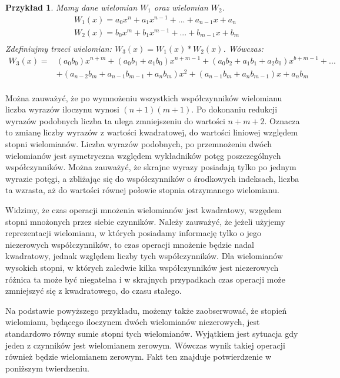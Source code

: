 \documentclass[twoside,a4paper]{book}
\newtheorem{example}{Przykład}
\begin{document}
\begin{example}
	Mamy dane wielomian $W_1$ oraz wielomian $W_2$.
	\begin{equation}
	\begin{split}
	&W_1(x) = a_0x^n + a_1x^{n-1} + ... + a_{n-1}x + a_n \\
	&W_2(x) = b_0x^m + b_1x^{m-1} + ... + b_{m-1}x + b_m \\
	\end{split}
	\end{equation}
	Zdefiniujmy trzeci wielomian: $W_3(x) = W_1(x) * W_2(x)$. Wówczas:
	\begin{equation}
		\begin{split}
		W_3(x) = &(a_0b_0)x^{n+m} + (a_0b_1+a_1b_0)x^{n+m-1} + (a_0b_2+a_1b_1+a_2b_0)x^{b+m-1} + ... \\
		&+ (a_{n-2}b_m+a_{n-1}b_{m-1}+a_nb_m)x^2 + (a_{n-1}b_m + a_nb_{m-1})x + a_nb_m \\
		\end{split}
	\end{equation}
\end{example}

Można zauważyć, że po wymnożeniu wszystkich współczynników wielomianu liczba wyrazów iloczynu wynosi $(n+1)(m+1)$. Po dokonaniu redukcji wyrazów podobnych liczba ta ulega zmniejszeniu do wartości $n+m+2$. Oznacza to zmianę liczby wyrazów z wartości kwadratowej, do wartości liniowej względem stopni wielomianów. Liczba wyrazów podobnych, po przemnożeniu dwóch wielomianów jest symetryczna względem wykładników potęg poszczególnych współczynników. Można zauważyć, że skrajne wyrazy posiadają tylko po jednym wyrazie potęgi, a zbliżając się do współczynników o środkowych indeksach, liczba ta wzrasta, aż do wartości równej połowie stopnia otrzymanego wielomianu. \newline

Widzimy, że czas operacji mnożenia wielomianów jest kwadratowy, wzgędem stopni mnożonych przez siebie czynników. Należy zauważyć, że jeżeli użyjemy reprezentacji wielomianu, w których posiadamy informację tylko o jego niezerowych współczynników, to czas operacji mnożenie będzie nadal kwadratowy, jednak względem liczby tych współczynników. Dla wielomianów wysokich stopni, w których zaledwie kilka współczynników jest niezerowych różnica ta może być niegatelna i w skrajnych przypadkach czas operacji może zmniejszyć się z kwadratowego, do czasu stałego.

Na podstawie powyższego przykładu, możemy także zaobserwować, że stopień wielomianu, będącego iloczynem dwóch wielomianów niezerowych, jest standardowo równy sumie stopni tych wielomianów. Wyjątkiem jest sytuacja gdy jeden z czynników jest wielomianem zerowym. Wówczas wynik takiej operacji również będzie wielomianem zerowym. Fakt ten znajduje potwierdzenie w poniższym twierdzeniu.
\end{document}
